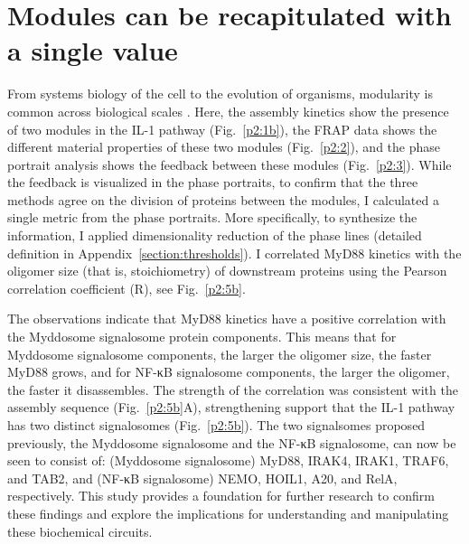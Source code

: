 \section{Modules can be recapitulated with a single value}
\label{section:single_value}
From systems biology of the cell to the evolution of organisms, modularity is common across biological scales \autocite{Sadowski_1986}. Here, the assembly kinetics show the presence of two modules in the IL-1 pathway (Fig.~\ref{p2:1b}), the FRAP data shows the different material properties of these two modules (Fig.~\ref{p2:2}), and the phase portrait analysis shows the feedback between these modules (Fig.~\ref{p2:3}). While the feedback is visualized in the phase portraits, to confirm that the three methods agree on the division of proteins between the modules, I calculated a single metric from the phase portraits. More specifically, to synthesize the information, I applied dimensionality reduction of the phase lines (detailed definition in Appendix~\ref{section:thresholds}). I correlated MyD88 kinetics with the oligomer size (that is, stoichiometry) of downstream proteins using the Pearson correlation coefficient (R), see Fig.~\ref{p2:5b}.

The observations indicate that MyD88 kinetics have a positive correlation with the Myddosome signalosome protein components. This means that for Myddosome signalosome components, the larger the oligomer size, the faster MyD88 grows, and for NF-κB signalosome components, the larger the oligomer, the faster it disassembles. The strength of the correlation was consistent with the assembly sequence (Fig.~\ref{p2:5b}A), strengthening support that the IL-1 pathway has two distinct signalosomes (Fig.~\ref{p2:5b}). The two signalsomes proposed previously, the Myddosome signalosome and the NF-κB signalosome, can now be seen to consist of: (Myddosome signalosome) MyD88, IRAK4, IRAK1, TRAF6, and TAB2, and (NF-κB signalosome) NEMO, HOIL1, A20, and RelA, respectively. This study provides a foundation for further research to confirm these findings and explore the implications for understanding and manipulating these biochemical circuits.


